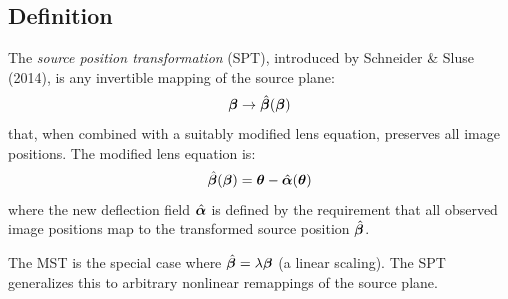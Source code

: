\subsection{Definition}

The \emph{source position transformation} (SPT), introduced by
Schneider \& Sluse (2014), is any invertible mapping of the source
plane:
\begin{equation}
    \boldsymbol{\beta} \to \hat{\boldsymbol{\beta}}(\boldsymbol{\beta})
    \label{eq:spt_def}
\end{equation}
that, when combined with a suitably modified lens equation, preserves
all image positions.  The modified lens equation is:
\begin{equation}
    \hat{\boldsymbol{\beta}}(\boldsymbol{\beta})
    = \boldsymbol{\theta} - \hat{\boldsymbol{\alpha}}(\boldsymbol{\theta})
    \label{eq:spt_lens_eq}
\end{equation}
where the new deflection field $\hat{\boldsymbol{\alpha}}$ is defined by the
requirement that all observed image positions map to the transformed
source position $\hat{\boldsymbol{\beta}}$.

The MST is the special case where $\hat{\boldsymbol{\beta}} = \lambda\boldsymbol{\beta}$
(a linear scaling).  The SPT generalizes this to arbitrary nonlinear
remappings of the source plane.

